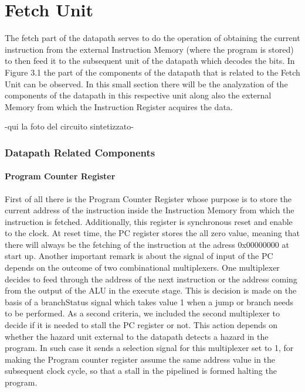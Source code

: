 %
\chapter{Fetch Unit}
\label{FetchUnit}

The fetch part of the datapath serves to do the operation of obtaining the current instruction
from the external Instruction Memory (where the program is stored) to then feed it to the subsequent unit of the datapath which decodes the bits.
In Figure 3.1 the part of the components of the datapath that is related to the Fetch Unit can be observed.
In this small section there will be the analyzation of the components of the datapath in this respective unit along also the external Memory from which the Instruction Register acquires the data.


-qui la foto del circuito sintetizzato-


\subsection{Datapath Related Components}

\subsubsection{ Program Counter Register }
First of all there is the Program Counter Register whose purpose is to store the current address of the instruction inside the Instruction Memory from
which the instruction is fetched. Additionally, this register is synchronous reset and enable to the clock. At reset time, the PC register stores the 
all zero value, meaning that there will always be the fetching of the instruction at the adress 0x00000000 at start up. 
Another important remark is about the signal of input of the PC depends on the outcome of two combinational multiplexers. One multiplexer decides to
feed through the address of the next instruction or the address coming from the output of the ALU in the execute stage. This is decision is made on the basis
of a branchStatus signal which takes value 1 when a jump or branch needs to be performed.
As a second criteria, we included the second multiplexer to decide if it is needed to stall the PC register or not. This action depends on whether the hazard unit
external to the datapath detects a hazard in the program. In such case it sends a selection signal for this multiplexer set to 1, for making the Program 
counter register assume the same address value in the subsequent clock cycle, so that a stall in the pipelined is formed halting the program.

